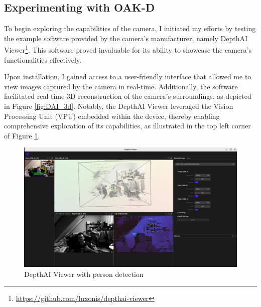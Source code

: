 \subsection{Experimenting with OAK-D}

To begin exploring the capabilities of the camera, I initiated my efforts by testing the example software provided by the camera's manufacturer, namely DepthAI Viewer\footnote{\url{https://github.com/luxonis/depthai-viewer}}. This software proved invaluable for its ability to showcase the camera's functionalities effectively.

Upon installation, I gained access to a user-friendly interface that allowed me to view images captured by the camera in real-time. Additionally, the software facilitated real-time 3D reconstruction of the camera's surroundings, as depicted in Figure \ref{fig:DAI_3d}. Notably, the DepthAI Viewer leveraged the Vision Processing Unit (VPU) embedded within the device, thereby enabling comprehensive exploration of its capabilities, as illustrated in the top left corner of Figure \ref{fig:DAI_person_detection}.

\begin{figure}[H]
	\centering
	\includegraphics[width=150mm, keepaspectratio]{figures/depthai_viewer.png}
	\caption{DepthAI Viewer with person detection}
	\label{fig:DAI_person_detection}
\end{figure}

